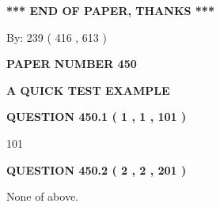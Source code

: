 \documentclass[12pt]{article}
\begin{document}
 
 
 
   
   
 \vspace{0.2in}
 
   
   
   
   
\vspace{1.0in} 
{\textbf{\large{ *** END OF PAPER, THANKS *** }}} 
   
   
\hspace{1.0in} By: 
 239 ( 416 ,  613 )
   
   
   
   
\newpage 
\setcounter{page}{ 
   450001 } 
   
   
   
   
 {\textbf{ \Large{ PAPER NUMBER  450  }}}
   
   
\vspace{0.2in}
   
   
   
   
   
   
 \vspace{0.2in}
{\LARGE {\textbf{ A QUICK TEST EXAMPLE}}}
   
   
  
\vspace{0.2in}
  
{\textbf{\Large{QUESTION
450.1 
 ( 1 , 1 , 101 )
}}}
  
  
 
 
\noindent{}

101
 
 
  
\vspace{0.2in}
  
{\textbf{\Large{QUESTION
450.2 
 ( 2 , 2 , 201 )
}}}
  
  
 
 
\noindent{}
 
 
 None of above.
 
 
 
 
   
   
 \vspace{0.2in}
 
   
   
   
   
\end{document}
